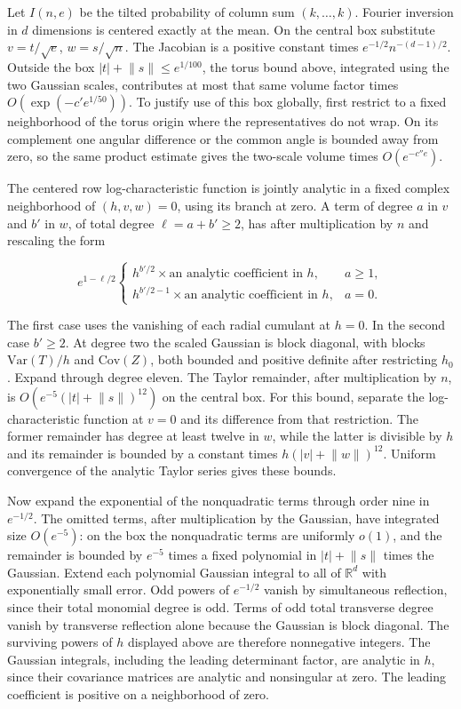 \documentclass[11pt]{article}
\begin{document}
Let $I(n,e)$ be the tilted probability of column sum $(k,\ldots,k)$. Fourier inversion in $d$ dimensions is centered exactly at the mean. On the central box substitute $v=t/\sqrt e$, $w=s/\sqrt n$. The Jacobian is a positive constant times $e^{-1/2}n^{-(d-1)/2}$. Outside the box $|t|+\lVert s\rVert \le e^{1/100}$, the torus bound above, integrated using the two Gaussian scales, contributes at most that same volume factor times $O(\exp(-c'e^{1/50}))$. To justify use of this box globally, first restrict to a fixed neighborhood of the torus origin where the representatives do not wrap. On its complement one angular difference or the common angle is bounded away from zero, so the same product estimate gives the two-scale volume times $O(e^{-c'' e})$.

The centered row log-characteristic function is jointly analytic in a fixed complex neighborhood of $(h,v,w)=0$, using its branch at zero. A term of degree $a$ in $v$ and $b'$ in $w$, of total degree $\ell=a+b'\ge2$, has after multiplication by $n$ and rescaling the form

\begin{equation*}
e^{1-\ell/2}\begin{cases}
h^{b'/2}\times\text{an analytic coefficient in }h,& a\ge1,\\
h^{b'/2-1}\times\text{an analytic coefficient in }h,&a=0.
\end{cases}
\end{equation*}

The first case uses the vanishing of each radial cumulant at $h=0$. In the second case $b'\ge2$. At degree two the scaled Gaussian is block diagonal, with blocks $\mathrm{Var}(T)/h$ and $\mathrm{Cov}(Z)$, both bounded and positive definite after restricting $h_0$. Expand through degree eleven. The Taylor remainder, after multiplication by $n$, is $O(e^{-5}(|t|+\lVert s\rVert )^{12})$ on the central box. For this bound, separate the log-characteristic function at $v=0$ and its difference from that restriction. The former remainder has degree at least twelve in $w$, while the latter is divisible by $h$ and its remainder is bounded by a constant times $h(|v|+\lVert w\rVert )^{12}$. Uniform convergence of the analytic Taylor series gives these bounds.

Now expand the exponential of the nonquadratic terms through order nine in $e^{-1/2}$. The omitted terms, after multiplication by the Gaussian, have integrated size $O(e^{-5})$: on the box the nonquadratic terms are uniformly $o(1)$, and the remainder is bounded by $e^{-5}$ times a fixed polynomial in $|t|+\lVert s\rVert $ times the Gaussian. Extend each polynomial Gaussian integral to all of $\mathbb R^d$ with exponentially small error. Odd powers of $e^{-1/2}$ vanish by simultaneous reflection, since their total monomial degree is odd. Terms of odd total transverse degree vanish by transverse reflection alone because the Gaussian is block diagonal. The surviving powers of $h$ displayed above are therefore nonnegative integers. The Gaussian integrals, including the leading determinant factor, are analytic in $h$, since their covariance matrices are analytic and nonsingular at zero. The leading coefficient is positive on a neighborhood of zero.
\end{document}
